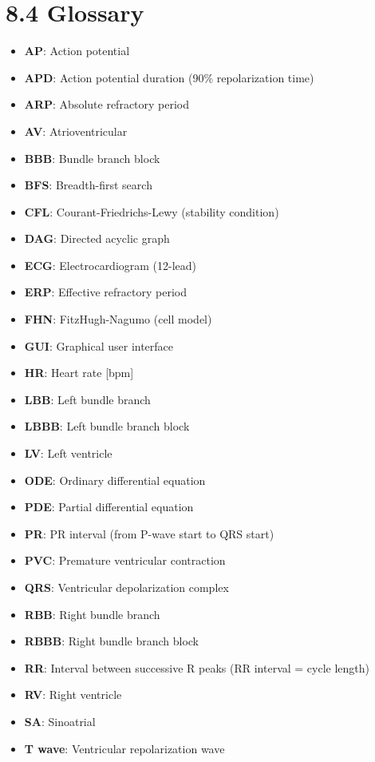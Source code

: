 \documentclass[12pt,oneside,a4paper]{book}
\begin{document}
\section{8.4 Glossary}

\begin{itemize}
  \item \textbf{AP}: Action potential
  \item \textbf{APD}: Action potential duration (90\% repolarization time)
  \item \textbf{ARP}: Absolute refractory period
  \item \textbf{AV}: Atrioventricular
  \item \textbf{BBB}: Bundle branch block
  \item \textbf{BFS}: Breadth-first search
  \item \textbf{CFL}: Courant-Friedrichs-Lewy (stability condition)
  \item \textbf{DAG}: Directed acyclic graph
  \item \textbf{ECG}: Electrocardiogram (12-lead)
  \item \textbf{ERP}: Effective refractory period
  \item \textbf{FHN}: FitzHugh-Nagumo (cell model)
  \item \textbf{GUI}: Graphical user interface
  \item \textbf{HR}: Heart rate [bpm]
  \item \textbf{LBB}: Left bundle branch
  \item \textbf{LBBB}: Left bundle branch block
  \item \textbf{LV}: Left ventricle
  \item \textbf{ODE}: Ordinary differential equation
  \item \textbf{PDE}: Partial differential equation
  \item \textbf{PR}: PR interval (from P-wave start to QRS start)
  \item \textbf{PVC}: Premature ventricular contraction
  \item \textbf{QRS}: Ventricular depolarization complex
  \item \textbf{RBB}: Right bundle branch
  \item \textbf{RBBB}: Right bundle branch block
  \item \textbf{RR}: Interval between successive R peaks (RR interval = cycle length)
  \item \textbf{RV}: Right ventricle
  \item \textbf{SA}: Sinoatrial
  \item \textbf{T wave}: Ventricular repolarization wave
\end{itemize}
\end{document}
